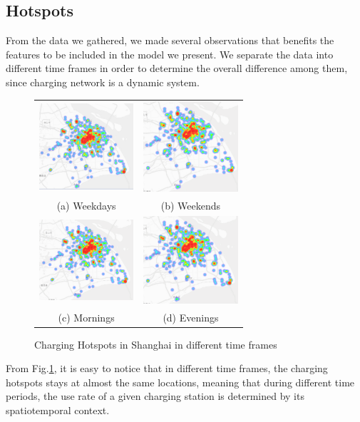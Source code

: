 \documentclass[conference]{IEEEtran}
\begin{document}
\subsection{Hotspots}
From the data we gathered, we made several observations that benefits the features to be included in the model we present. We separate the data into different time frames in order to determine the overall difference among them, since charging network is a dynamic system.
\begin{figure}[htbp]
	\begin{tabular}{cc}
		\includegraphics[width=35mm]{weekday.pdf} &  \includegraphics[width=35mm]{weekend.pdf} \\
		(a) Weekdays & (b) Weekends \\[6pt] 
		\includegraphics[width=35mm]{morning.pdf} &
		\includegraphics[width=35mm]{evening.pdf} \\
		(c) Mornings & (d) Evenings
	\end{tabular}
	\centering
	\caption{Charging Hotspots in Shanghai in different time frames}
	\label{fig2}
\end{figure}
From Fig.\ref{fig2}, it is easy to notice that in different time frames, the charging hotspots stays at almost the same locations, meaning that during different time periods, the use rate of a given charging station is determined by its spatiotemporal context.
\end{document}
